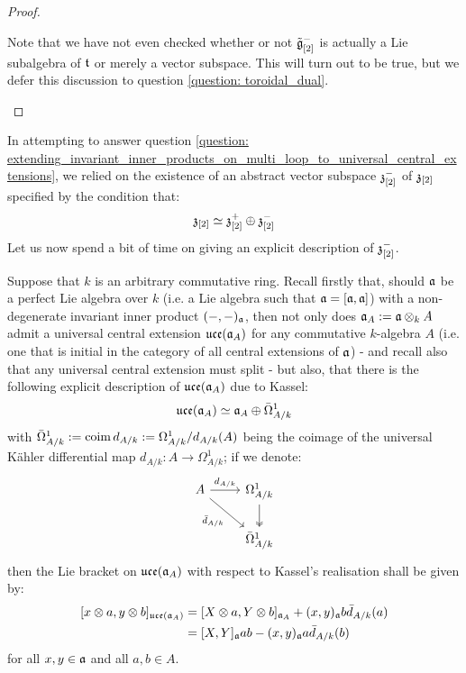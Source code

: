 \begin{proof}
\begin{enumerate}
                        Note that we have not even checked whether or not $\tilde{\mathfrak{g}}_{[2]}^-$ is actually a Lie subalgebra of $\mathfrak{t}$ or merely a vector subspace. This will turn out to be true, but we defer this discussion to question \ref{question: toroidal_dual}. 
                    \end{enumerate}
                \end{proof}
            \begin{remark} \label{remark: centres_of_dual_toroidal_lie_algebras}
                In attempting to answer question \ref{question: extending_invariant_inner_products_on_multi_loop_to_universal_central_extensions}, we relied on the existence of an abstract vector subspace $\mathfrak{z}_{[2]}^-$ of $\mathfrak{z}_{[2]}$ specified by the condition that:
                    $$\mathfrak{z}_{[2]} \simeq \mathfrak{z}_{[2]}^+ \oplus \mathfrak{z}_{[2]}^-$$
                Let us now spend a bit of time on giving an explicit description of $\mathfrak{z}_{[2]}^-$. 

                Suppose that $k$ is an arbitrary commutative ring. Recall firstly that, should $\mathfrak{a}$ be a perfect Lie algebra over $k$ (i.e. a Lie algebra such that $\mathfrak{a} = [\mathfrak{a}, \mathfrak{a}]$) with a non-degenerate invariant inner product $(-, -)_{\mathfrak{a}}$, then not only does $\a_A := \a \tensor_k A$ admit a universal central extension $\mathfrak{uce}(\mathfrak{a}_A)$ for any commutative $k$-algebra $A$ (i.e. one that is initial in the category of all central extensions of $\mathfrak{a}$) - and recall also that any universal central extension must split - but also, that there is the following explicit description of $\mathfrak{uce}(\mathfrak{a}_A)$ due to Kassel:
                    $$\mathfrak{uce}(\mathfrak{a}_A) \simeq \mathfrak{a}_A \oplus \bar{\Omega}^1_{A/k}$$
                with $\bar{\Omega}^1_{A/k} := \operatorname{coim} d_{A/k} := \Omega^1_{A/k}/d_{A/k}(A)$ being the coimage of the universal K\"ahler differential map $d_{A/k}: A \to \Omega^1_{A/k}$; if we denote:
                    $$
                        \begin{tikzcd}
                    	A & {\Omega^1_{A/k}} \\
                    	& {\bar{\Omega}^1_{A/k}}
                    	\arrow[two heads, from=1-2, to=2-2]
                    	\arrow["{d_{A/k}}", from=1-1, to=1-2]
                    	\arrow["{\bar{d}_{A/k}}"', from=1-1, to=2-2]
                        \end{tikzcd}
                    $$
                then the Lie bracket on $\mathfrak{uce}(\mathfrak{a}_A)$ with respect to Kassel's realisation shall be given by:
                    $$
                        \begin{aligned}
                            [ x \tensor a, y \tensor b ]_{\uce(\a_A)} & = [ X \tensor a, Y \tensor b ]_{\a_A} + (x, y)_{\a} b \bar{d}_{A/k}(a)
                            \\
                            & = [X, Y]_{\a} ab - (x, y)_{\a} a \bar{d}_{A/k}(b)
                        \end{aligned}
                    $$
                for all $x, y \in \mathfrak{a}$ and all $a, b \in A$.


\end{remark}
